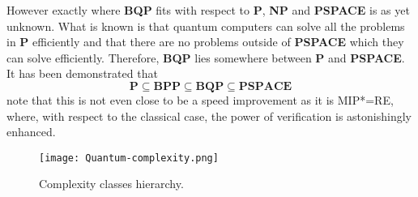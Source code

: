 However exactly where \textbf{BQP} fits with respect to \textbf{P}, \textbf{NP} and \textbf{PSPACE} is as yet unknown. What is known is that quantum computers can solve all the problems in \textbf{P} efficiently and that there are no problems outside of \textbf{PSPACE} which they can solve efficiently. Therefore, \textbf{BQP} lies somewhere between \textbf{P} and \textbf{PSPACE}.
It has been demonstrated that
\begin{equation*}
   \textbf{P}   \subseteq \textbf{BPP} \subseteq \textbf{BQP}  \subseteq \textbf{PSPACE}
\end{equation*}
note that this is not even close to be a speed improvement  as it is MIP*=RE, where, with respect to the classical case, the power of verification is astonishingly enhanced.


\begin{figure}[h]
    \texttt{[image: Quantum-complexity.png]}
    \centering
    \caption{Complexity classes hierarchy.}
    \end{figure}